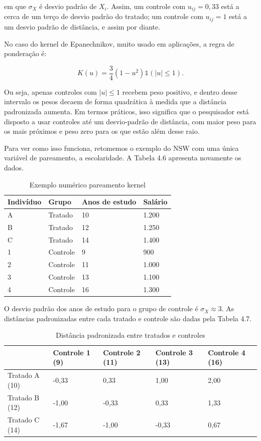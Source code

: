 em que $\sigma_X$ é desvio padrão de $X_i$. Assim, um controle com $u_{ij} = 0,33$ está a cerca de um terço de desvio padrão do tratado; um controle com $u_{ij} = 1$ está a um desvio padrão de distância, e assim por diante.

No caso do kernel de Epanechnikov, muito usado em aplicações, a regra de ponderação é:

$$
K(u) = \frac{3}{4} (1-u^2)\mathds{1}(| u | \leq 1).
$$

Ou seja, apenas controles com $|u| \leq 1$ recebem peso positivo, e dentro desse intervalo os pesos decaem de forma quadrática à medida que a distância padronizada aumenta. Em termos práticos, isso significa que o pesquisador está disposto a usar controles até um desvio-padrão de distância, com maior peso para os mais próximos e peso zero para os que estão além desse raio.

Para ver como isso funciona, retomemos o exemplo do NSW com uma única variável de pareamento, a escolaridade. A Tabela 4.6 apresenta novamente os dados.

\begin{table}[h]
    \centering
    \begin{tabular}{llll}
        Indivíduo & Grupo & Anos de estudo & Salário\\\midrule
        A & Tratado  & 10 & 1.200  \\
        B & Tratado  & 12 & 1.250  \\
        C & Tratado  & 14 & 1.400  \\
        1 & Controle &  9 & 900  \\
        2 & Controle & 11 & 1.000  \\
        3 & Controle & 13 & 1.100  \\
        4 & Controle & 16 & 1.300  \\\bottomrule
    \end{tabular}
    \caption{Exemplo numérico pareamento kernel}
    \label{tab:placeholder}
\end{table}

O desvio padrão dos anos de estudo para o grupo de controle é $\sigma_X \approx 3$. As distâncias padronizadas entre cada tratado e controle são dadas pela Tabela 4.7.

\begin{table}[h]
    \centering
    \begin{tabular}{lllll}
         & Controle 1 (9) & Controle 2 (11) & Controle 3 (13) & Controle 4 (16) \\\midrule
        Tratado A (10) & -0,33 & 0,33 & 1,00 & 2,00\\
        Tratado B (12) & -1,00 & -0,33 & 0,33 & 1,33\\
        Tratado C (14) & -1,67 & -1,00 & -0,33 & 0,67 \\\bottomrule
    \end{tabular}
    \caption{Distância padronizada entre tratados e controles}
    \label{tab:placeholder}
\end{table}


